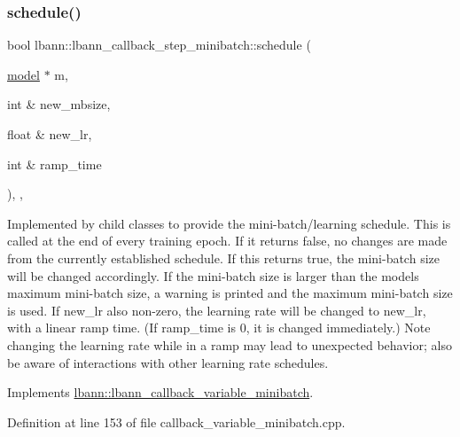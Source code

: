 \mbox{\label{classlbann_1_1lbann__callback__step__minibatch_a9ed85aa78f6e4fe4cf3427f9257a4610}} 
\subsubsection{\texorpdfstring{schedule()}{schedule()}}
{\footnotesize\ttfamily bool lbann\+::lbann\+\_\+callback\+\_\+step\+\_\+minibatch\+::schedule (\begin{DoxyParamCaption}\item[{\hyperlink{classlbann_1_1model}{model} $\ast$}]{m,  }\item[{int \&}]{new\+\_\+mbsize,  }\item[{float \&}]{new\+\_\+lr,  }\item[{int \&}]{ramp\+\_\+time }\end{DoxyParamCaption})\hspace{0.3cm}{\ttfamily [override]}, {\ttfamily [protected]}, {\ttfamily [virtual]}}

Implemented by child classes to provide the mini-\/batch/learning schedule. This is called at the end of every training epoch. If it returns false, no changes are made from the currently established schedule. If this returns true, the mini-\/batch size will be changed accordingly. If the mini-\/batch size is larger than the model\textquotesingle{}s maximum mini-\/batch size, a warning is printed and the maximum mini-\/batch size is used. If new\+\_\+lr also non-\/zero, the learning rate will be changed to new\+\_\+lr, with a linear ramp time. (If ramp\+\_\+time is 0, it is changed immediately.) Note changing the learning rate while in a ramp may lead to unexpected behavior; also be aware of interactions with other learning rate schedules. 

Implements \hyperlink{classlbann_1_1lbann__callback__variable__minibatch_ace13e8941491ddd28ef35c277cecb1ad}{lbann\+::lbann\+\_\+callback\+\_\+variable\+\_\+minibatch}.



Definition at line 153 of file callback\+\_\+variable\+\_\+minibatch.\+cpp.


